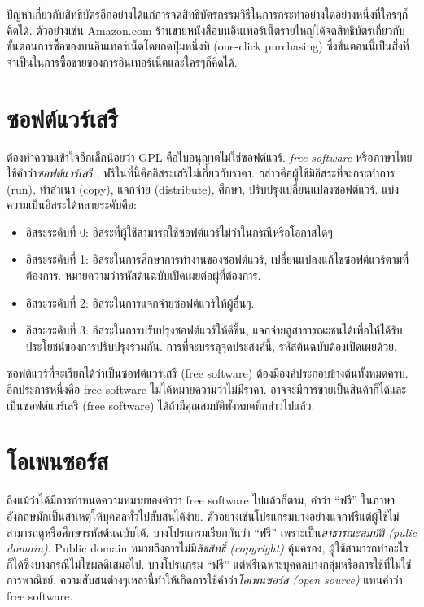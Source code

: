 \begin{thwbr}
{ปัญหาเกี่ยวกับสิทธิบัตรอีกอย่างได้แก่การจดสิทธิบัตรกรรมวิธีในการกระทำอย่างใดอย่างหนึ่งที่ใครๆก็คิดได้. ตัวอย่างเช่น Amazon.com ร้านขายหนังสือบนอินเทอร์เน็ตรายใหญ่ได้จดสิทธิบัตรเกี่ยวกับขั้นตอนการซื้อของบนอินเทอร์เน็ตโดยกดปุ่มหนึ่งที (one-click purchasing) \cite{amazonpatent} ซึ่งขั้นตอนนี้เป็นสิ่งที่จำเป็นในการซื้อขายของการอินเทอร์เน็ตและใครๆก็คิดได้. 



\section{ซอฟต์แวร์เสรี}
ต้องทำความเข้าใจอีกเล็กน้อยว่า GPL คือใบอนุญาตไม่ใช่ซอฟต์แวร์. \emph{free software} \cite{fsf,freesoftware} หรือภาษาไทยใช้คำว่า{\em ซอฟต์แวร์เสรี}%
%
, ฟรีในที่นี้คืออิสระเสรีไม่เกี่ยวกับราคา. กล่าวคือผู้ใช้มีอิสระที่จะกระทำการ (run), ทำสำเนา (copy), แจกจ่าย (distribute), ศึกษา, ปรับปรุงเปลี่ยนแปลงซอฟต์แวร์. แบ่งความเป็นอิสระได้หลายระดับคือ:
\begin{itemize}
\item อิสระระดับที่ 0: อิสระที่ผู้ใช้สามารถใช้ซอฟต์แวร์ไม่ว่าในกรณีหรือโอกาสใดๆ
\item อิสระระดับที่ 1: อิสระในการศึกษาการทำงานของซอฟต์แวร์, เปลี่ยนแปลงแก้ไขซอฟต์แวร์ตามที่ต้องการ. หมายความว่ารหัสต้นฉบับเปิดเผยต่อผู้ที่ต้องการ.
\item อิสระระดับที่ 2: อิสระในการแจกจ่ายซอฟต์แวร์ให้ผู้อื่นๆ.
\item อิสระระดับที่ 3: อิสระในการปรับปรุงซอฟต์แวร์ให้ดีขึ้น, แจกจ่ายสู่สาธารณะชนได้เพื่อให้ได้รับประโยชน์ของการปรับปรุงร่วมกัน. การที่จะบรรลุจุดประสงค์นี้, รหัสต้นฉบับต้องเปิดเผยด้วย.
\end{itemize} 
ซอฟต์แวร์ที่จะเรียกได้ว่าเป็นซอฟต์แวร์เสรี (free software) ต้องมีองค์ประกอบข้างต้นทั้งหมดครบ. อีกประการหนึ่งคือ free software ไม่ได้หมายความว่าไม่มีราคา. อาจจะมีการขายเป็นสินค้าก็ได้และเป็นซอฟต์แวร์เสรี (free software) ได้ถ้ามีคุณสมบัติทั้งหมดที่กล่าวไปแล้ว.



\section{โอเพนซอร์ส}

ถึงแม้ว่าได้มีการกำหนดความหมายของคำว่า free software ไปแล้วก็ตาม, คำว่า ``ฟรี'' ในภาษาอังกฤษมักเป็นสาเหตุให้บุคคลทั่วไปสับสนได้ง่าย. ตัวอย่างเช่นโปรแกรมบางอย่างแจกฟรีแต่ผู้ใช้ไม่สามารถดูหรือศึกษารหัสต้นฉบับได้. บางโปรแกรมเรียกกันว่า ``ฟรี'' เพราะเป็น{\em สาธารณะสมบัติ (pulic domain)}. Public domain หมายถึงการไม่มี{\em ลิขสิทธิ์ (copyright)} คุ้มครอง, ผู้ใช้สามารถทำอะไรก็ได้ซึ่งบางกรณีไม่ใช่ผลดีเสมอไป. บางโปรแกรม ``ฟรี'' แต่ฟรีเฉพาะบุคคลบางกลุ่มหรือการใช้ที่ไม่ใช่การพาณิชย์. ความสับสนต่างๆเหล่านี้ทำให้เกิดการใช้คำว่า{\em โอเพนซอร์ส (open source)} แทนคำว่า free software. 

}
\end{thwbr}
